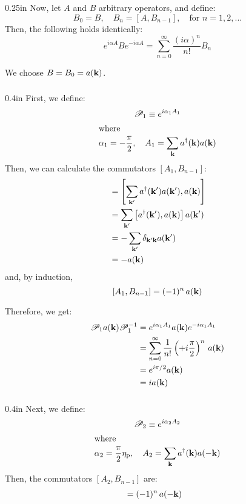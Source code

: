 \documentclass[letterpaper,12pt]{article}
\newenvironment{problem}{\subsection{}\begin{adjustwidth}{0.25in}{}\vspace{-\baselineskip}}{\end{adjustwidth}}
\newenvironment{subproblem}{\subsubsection{}\begin{adjustwidth}{0.4in}{}\vspace{-\baselineskip}}{\end{adjustwidth}}
\newcommand{\define}{\equiv}
\begin{document}
\begin{problem}
Now, let $A$ and $B$ arbitrary operators, and define:
\begin{equation*}
	B_0=B , \quad B_n =\left[A, B_{n-1}\right] , \quad \text{for } n=1, 2, ...
\end{equation*}
Then, the following holds identically:
\begin{equation*}
	e^{i\alpha A} B e^{-i\alpha A} = \sum_{n=0}^{\infty} \frac{(i\alpha)^n}{n!} B_n
\end{equation*}

We choose $B = B_0 = a(\vb{k})$.

\begin{subproblem}
	First, we define:
	\begin{gather*}
		\mathscr{P}_1 \define e^{i\alpha_1 A_1}	\\
	\intertext{where}
		\alpha_1 = -\frac{\pi}{2} , \quad A_1 = \sum_{\vb{k}}a^\dagger(\vb{k})a(\vb{k})
	\end{gather*}
	Then, we can calculate the commutators $[A_1, B_{n-1}]$:
	\begin{align*}
		[A_1, B_0] &= \left[\sum_{\vb{k}'} a^\dagger(\vb{k}')a(\vb{k}'), a(\vb{k})\right]	\\
		&= \sum_{\vb{k}'} \left[a^\dagger(\vb{k}'), a(\vb{k})\right]a(\vb{k}')	\\
		&= -\sum_{\vb{k}'} \delta_{\vb{k}'\vb{k}} a(\vb{k}')	\\
		&= -a(\vb{k})
	\end{align*}
	and, by induction,
	\begin{equation*}
		\left[A_1, B_{n-1}\right] = (-1)^n \, a(\vb{k})
	\end{equation*}
	
	Therefore, we get:
	\begin{align*}
		\mathscr{P}_1 a(\vb{k}) \mathscr{P}_1^{-1}
		&= e^{i\alpha_1A_1} a(\vb{k}) e^{-i\alpha_1A_1}	\\
		&= \sum_{n=0}^{\infty} \frac{1}{n!} \left(+i\frac{\pi}{2}\right)^n \, a(\vb{k})	\\
		&= e^{i\pi/2} a(\vb{k})	\\
		&= i a(\vb{k})
	\end{align*}
\end{subproblem}

\begin{subproblem}
	Next, we define:
	\begin{gather*}
		\mathscr{P}_2 \define e^{i\alpha_2 A_2} 	\\
	\intertext{where}
		\alpha_2 = \frac{\pi}{2}\eta_\text{p} , \quad
		A_2 = \sum_{\vb{k}} a^\dagger(\vb{k}) a(-\vb{k})
	\end{gather*}
	Then, the commutators $[A_2, B_{n-1}]$ are:
	\begin{align*}
		[A_2, B_{n_1}] &= (-1)^n \, a(-\vb{k})
	\end{align*}
	

\end{subproblem}
\end{problem}
\end{document}
